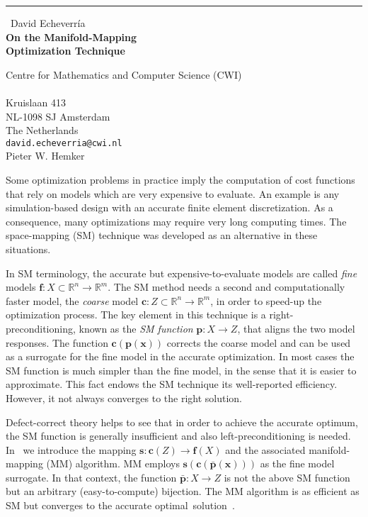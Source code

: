 \documentclass{report}
\begin{document}
\begin{center}
\rule{6in}{1pt} \
{\large David Echeverr\'{i}a \\
{\bf On the Manifold-Mapping \\Optimization Technique}}

Centre for Mathematics and Computer Science (CWI)\\ \\ Kruislaan 413 \\ NL-1098 SJ Amsterdam \\ The Netherlands
\\
{\tt david.echeverria@cwi.nl}\\
Pieter W. Hemker\end{center}

\newcommand{\ff}{{\mathbf f}}
\newcommand{\pp}{{\mathbf p}}
\newcommand{\ppb}{\bar{{\mathbf p}}}
\newcommand{\xx}{{\mathbf x}}
\renewcommand{\ss}{{\mathbf s}}
\newcommand{\yy}{{\mathbf y}}
\newcommand{\cc}{{\mathbf c}}
\newcommand{\RR}{\ensuremath{\mathbb{R}}}
\thispagestyle{empty}

Some optimization problems in practice imply the computation of cost
functions that rely on models which are very expensive to evaluate.
An example is any simulation-based design with an accurate finite
element discretization. As a consequence, many optimizations may
require very long computing times. The space-mapping (SM) technique
\cite{smlist010,survey2004} was developed as an alternative in these
situations.

In SM terminology, the accurate but expensive-to-evaluate models are
called {\it fine} models \mbox{$\ff:X \subset \RR^n \to \RR^m$}. The
SM method needs a second and computationally faster model, the {\it
coarse} model \mbox{$\cc:Z \subset \RR^n \to \RR^m$}, in order to
speed-up the optimization process. The key element in this technique
is a right-preconditioning, known as the {\it SM function}
\mbox{$\pp:X \to Z$}, that aligns the two model responses. The
function $\cc(\pp(\xx))$ corrects the coarse model and can be used
as a surrogate for the fine model in the accurate optimization. In
most cases the SM function is much simpler than the fine model, in
the sense that it is easier to approximate. This fact endows the SM
technique its well-reported efficiency. However, it not always
converges to the right solution.

Defect-correct theory \cite{dcp} helps to see that in order to
achieve the accurate optimum, the SM function is generally
insufficient and also left-preconditioning is needed. \mbox{In
\cite{paper01}} we introduce the mapping \mbox{$\ss:\cc(Z) \to
\ff(X)$} and the associated manifold-mapping (MM) algorithm. MM
employs $\ss(\cc(\ppb(\xx)))$ as the fine model surrogate. In that
context, the function $\ppb:X \to Z$ is not the above SM function
but an arbitrary (easy-to-compute) bijection. The MM algorithm is as
efficient as SM but converges to the accurate \mbox{optimal solution
\cite{paper01,paper02}}.
\end{document}
